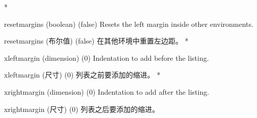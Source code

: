 \begin{optionlist}
\begin{paracol}{2}
\switchcolumn[0]*%
\item[resetmargins (boolean) (false)]
Resets the left margin inside other environments.
\switchcolumn
\item[resetmargins (布尔值) (false)]
在其他环境中重置左边距。
\switchcolumn[0]*%
\item[xleftmargin (dimension) (0)]
Indentation to add before the listing.
\switchcolumn
\item[xleftmargin (尺寸) (0)]
列表之前要添加的缩进。
\switchcolumn[0]*%
\item[xrightmargin (dimension) (0)]
Indentation to add after the listing.
\switchcolumn
\item[xrightmargin (尺寸) (0)]
列表之后要添加的缩进。
\end{paracol}
\end{optionlist}
